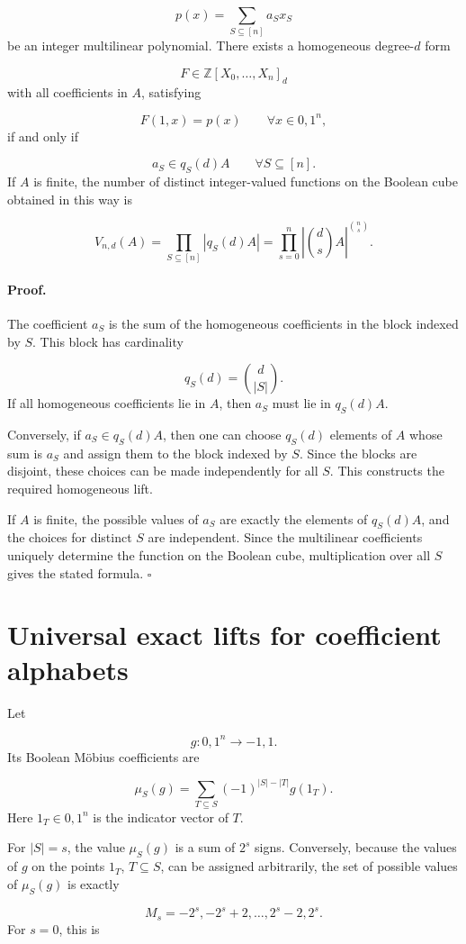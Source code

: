\documentclass[11pt]{article}
\theoremstyle{definition}
\begin{document}
\[
p(x)=\sum_{S\subseteq[n]}a_Sx_S
\]
be an integer multilinear polynomial. There exists a homogeneous degree-$d$ form

\[
F\in\mathbb{Z}[X_0,\dots,X_n]_d
\]
with all coefficients in $A$, satisfying

\[
F(1,x)=p(x)
\qquad
\forall x\in{0,1}^n,
\]
if and only if

\[
a_S\in q_S(d)A
\qquad
\forall S\subseteq[n].
\]
If $A$ is finite, the number of distinct integer-valued functions on the Boolean cube obtained in this way is

\[
V_{n,d}(A)
=
\prod_{S\subseteq[n]}
|q_S(d)A|
=
\prod_{s=0}^{n}
\left|\binom ds A\right|^{\binom ns}.
\]
\paragraph{Proof.}
The coefficient $a_S$ is the sum of the homogeneous coefficients in the block indexed by $S$. This block has cardinality

\[
q_S(d)=\binom d{|S|}.
\]
If all homogeneous coefficients lie in $A$, then $a_S$ must lie in $q_S(d)A$.

Conversely, if $a_S\in q_S(d)A$, then one can choose $q_S(d)$ elements of $A$ whose sum is $a_S$ and assign them to the block indexed by $S$. Since the blocks are disjoint, these choices can be made independently for all $S$. This constructs the required homogeneous lift.

If $A$ is finite, the possible values of $a_S$ are exactly the elements of $q_S(d)A$, and the choices for distinct $S$ are independent. Since the multilinear coefficients uniquely determine the function on the Boolean cube, multiplication over all $S$ gives the stated formula. $\square$

\section{Universal exact lifts for coefficient alphabets}
Let

\[
g:{0,1}^n\to{-1,1}.
\]
Its Boolean Möbius coefficients are

\[
\mu_S(g)
=
\sum_{T\subseteq S}
(-1)^{|S|-|T|}
g(1_T).
\]
Here $1_T\in{0,1}^n$ is the indicator vector of $T$.

For $|S|=s$, the value $\mu_S(g)$ is a sum of $2^s$ signs. Conversely, because the values of $g$ on the points $1_T$, $T\subseteq S$, can be assigned arbitrarily, the set of possible values of $\mu_S(g)$ is exactly

\[
M_s=
{-2^s,-2^s+2,\dots,2^s-2,2^s}.
\]
For $s=0$, this is
\end{document}

